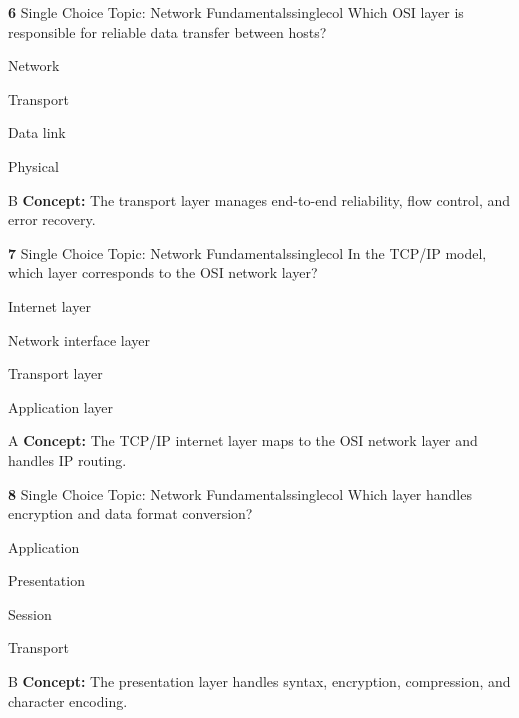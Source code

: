 \documentclass[10pt,a4paper]{article}
\begin{document}
\begin{qcard}{\color{white}\textbf{6} \hfill \small Single Choice \textbar{} Topic: Network Fundamentals}{singlecol}
Which OSI layer is responsible for reliable data transfer between hosts?

\begin{qoptions}
\item Network
\item Transport
\item Data link
\item Physical
\end{qoptions}
\begin{explainbox}{B}
\textbf{Concept:} The transport layer manages end-to-end reliability, flow control, and error recovery.
\end{explainbox}
\end{qcard}

\begin{qcard}{\color{white}\textbf{7} \hfill \small Single Choice \textbar{} Topic: Network Fundamentals}{singlecol}
In the TCP/IP model, which layer corresponds to the OSI network layer?

\begin{qoptions}
\item Internet layer
\item Network interface layer
\item Transport layer
\item Application layer
\end{qoptions}
\begin{explainbox}{A}
\textbf{Concept:} The TCP/IP internet layer maps to the OSI network layer and handles IP routing.
\end{explainbox}
\end{qcard}

\begin{qcard}{\color{white}\textbf{8} \hfill \small Single Choice \textbar{} Topic: Network Fundamentals}{singlecol}
Which layer handles encryption and data format conversion?

\begin{qoptions}
\item Application
\item Presentation
\item Session
\item Transport
\end{qoptions}
\begin{explainbox}{B}
\textbf{Concept:} The presentation layer handles syntax, encryption, compression, and character encoding.
\end{explainbox}
\end{qcard}
\end{document}
